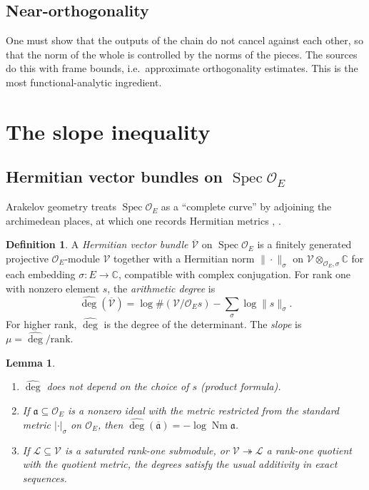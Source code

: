 \documentclass[11pt]{amsart}
\newtheorem{lemma}[theorem]{Lemma}
\theoremstyle{definition}
\newtheorem{definition}[theorem]{Definition}
\theoremstyle{remark}
\newcommand{\OEring}{\mathcal{O}_E}
\DeclareMathOperator{\Nm}{Nm}
\DeclareMathOperator{\Spec}{Spec}
\newcommand{\adeg}{\widehat{\deg}}
\newcommand{\C}{\mathbb{C}}
\begin{document}
\subsection*{Near-orthogonality}
One must show that the outputs of the chain do not cancel against each other, so that the norm of the whole is controlled by the norms of the pieces. The sources do this with frame bounds, i.e.\ approximate orthogonality estimates. This is the most functional-analytic ingredient.

\section{The slope inequality}\label{sec:slope}

\subsection{Hermitian vector bundles on $\Spec\OEring$}
Arakelov geometry treats $\Spec\OEring$ as a ``complete curve'' by adjoining the archimedean places, at which one records Hermitian metrics \cite{nLab-Arakelov}, \cite{Gillet-Soule}.

\begin{definition}
A \emph{Hermitian vector bundle} $\overline{\mathcal V}$ on $\Spec\OEring$ is a finitely generated projective $\OEring$-module $\mathcal V$ together with a Hermitian norm $\|\cdot\|_\sigma$ on $\mathcal V\otimes_{\OEring,\sigma}\C$ for each embedding $\sigma\colon E\to\C$, compatible with complex conjugation. For rank one with nonzero element $s$, the \emph{arithmetic degree} is
\[
\adeg(\overline{\mathcal V})=\log\#(\mathcal V/\OEring s)-\sum_\sigma\log\|s\|_\sigma .
\]
For higher rank, $\adeg$ is the degree of the determinant. The \emph{slope} is $\mu=\adeg/\mathrm{rank}$.
\end{definition}

\begin{lemma}\label{lem:adeg}
\begin{enumerate}[label=(\alph*)]
\item $\adeg$ does not depend on the choice of $s$ (product formula).
\item If $\mathfrak a\subseteq\OEring$ is a nonzero ideal with the metric restricted from the standard metric $|\cdot|_\sigma$ on $\OEring$, then $\adeg(\overline{\mathfrak a})=-\log\Nm\mathfrak a$.
\item If $\mathcal L\subseteq\mathcal V$ is a saturated rank-one submodule, or $\mathcal V\twoheadrightarrow\mathcal L$ a rank-one quotient with the quotient metric, the degrees satisfy the usual additivity in exact sequences.
\end{enumerate}
\end{lemma}
\end{document}
